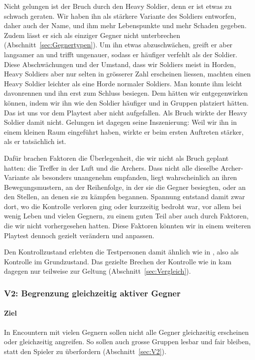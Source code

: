 \documentclass[../Main.tex]{subfiles}
\begin{document}
Nicht gelungen ist der Bruch durch den Heavy Soldier, denn er ist etwas zu schwach geraten. Wir haben ihn als stärkere Variante des Soldiers entworfen, daher auch der Name, und ihm mehr Lebenspunkte und mehr Schaden gegeben. Zudem lässt er sich als einziger Gegner nicht unterbrechen (Abschnitt~\ref{sec:Gegnertypen}). Um ihn etwas abzuschwächen, greift er aber langsamer an und trifft ungenauer, sodass er häufiger verfehlt als der Soldier. Diese Abschwächungen und der Umstand, dass wir Soldiers meist in Horden, Heavy Soldiers aber nur selten in grösserer Zahl erscheinen liessen, machten einen Heavy Soldier leichter als eine Horde normaler Soldiers. Man konnte ihm leicht davonrennen und ihn erst zum Schluss besiegen. Dem hätten wir entgegenwirken können, indem wir ihn wie den Soldier häufiger und in Gruppen platziert hätten. Das ist uns vor dem Playtest aber nicht aufgefallen. Als Bruch wirkte der Heavy Soldier damit nicht. Gelungen ist dagegen seine Inszenierung: Weil wir ihn in einem kleinen Raum eingeführt haben, wirkte er beim ersten Auftreten stärker, als er tatsächlich ist.

Dafür brachen Faktoren die Überlegenheit, die wir nicht als Bruch geplant hatten: die Treffer in der Luft und die Archers. Dass nicht alle dieselbe Archer-Variante als besonders unangenehm empfanden, liegt wahrscheinlich an ihren Bewegungsmustern, an der Reihenfolge, in der sie die Gegner besiegten, oder an den Stellen, an denen sie zu kämpfen begannen. Spannung entstand damit zwar dort, wo die Kontrolle verloren ging oder kurzzeitig bedroht war, vor allem bei wenig Leben und vielen Gegnern, zu einem guten Teil aber auch durch Faktoren, die wir nicht vorhergesehen hatten. Diese Faktoren könnten wir in einem weiteren Playtest dennoch gezielt verändern und anpassen.

Den Kontrollzustand erlebten die Testpersonen damit ähnlich wie in , also als Kontrolle im Grundzustand. Das gezielte Brechen der Kontrolle wie in  kam dagegen nur teilweise zur Geltung (Abschnitt~\ref{sec:Vergleich}).

\subsubsection{V2: Begrenzung gleichzeitig aktiver Gegner}

\paragraph{Ziel}
In Encountern mit vielen Gegnern sollen nicht alle Gegner gleichzeitig erscheinen oder gleichzeitig angreifen. So sollen auch grosse Gruppen lesbar und fair bleiben, statt den Spieler zu überfordern (Abschnitt~\ref{sec:V2}).
\end{document}
